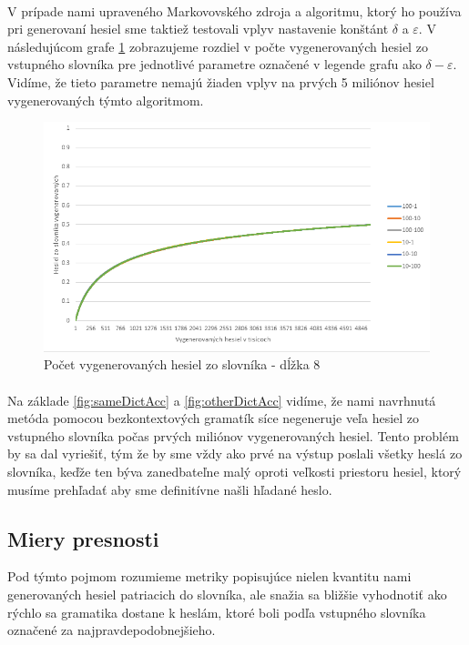 \paragraph{}
V prípade nami upraveného Markovovského zdroja a algoritmu, ktorý ho používa pri generovaní hesiel sme taktiež testovali vplyv nastavenie konštánt \(\delta\) a \(\varepsilon\). V následujúcom grafe \ref{fig:MarkovV2} zobrazujeme rozdiel v počte vygenerovaných hesiel zo vstupného slovníka pre jednotlivé parametre označené v legende grafu ako \(\delta-\varepsilon\). Vidíme, že tieto parametre nemajú žiaden vplyv na prvých 5 miliónov hesiel vygenerovaných týmto algoritmom.

\begin{figure}[ht]
    \centering
    \includegraphics[width=1\textwidth]{sameDictAccMarkv2}
    \caption{Počet vygenerovaných hesiel zo slovníka - dĺžka 8}
    \label{fig:MarkovV2}
\end{figure}

\paragraph{}
Na základe \ref{fig:sameDictAcc} a \ref{fig:otherDictAcc} vidíme, že nami navrhnutá metóda pomocou bezkontextových gramatík síce negeneruje veľa hesiel zo vstupného slovníka počas prvých miliónov vygenerovaných hesiel. Tento problém by sa dal vyriešiť, tým že by sme vždy ako prvé na výstup poslali všetky heslá zo slovníka, keďže ten býva zanedbateľne malý oproti veľkosti priestoru hesiel, ktorý musíme prehľadať aby sme definitívne našli hľadané heslo.

\subsection{Miery presnosti}
Pod týmto pojmom rozumieme metriky popisujúce nielen kvantitu nami generovaných hesiel patriacich do slovníka, ale snažia sa bližšie vyhodnotiť ako rýchlo sa gramatika dostane k heslám, ktoré boli podľa vstupného slovníka označené za najpravdepodobnejšieho.

